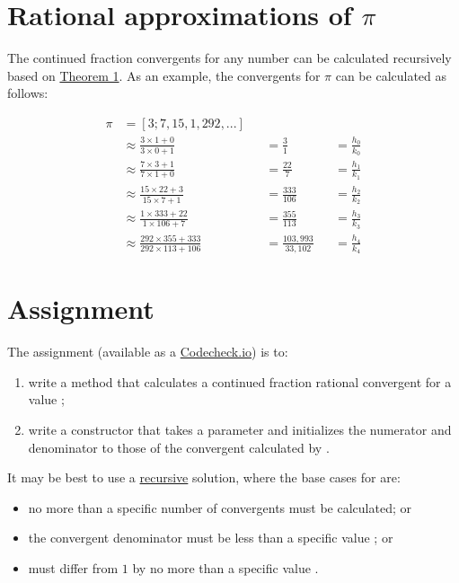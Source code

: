 \documentclass[11pt]{article}%
\begin{document}
\section{Rational approximations of \(\pi\)}
\label{Representation}

The continued fraction convergents for any number can be calculated recursively based on \href{http://en.wikipedia.org/wiki/Continued_fraction#Some_useful_theorems}{Theorem 1}. As an example, the convergents for \(\pi\) can be calculated as follows:

\begin{align}
\pi &= [3; 7, 15, 1, 292, ...] \\
 &\approx \frac{3 \times 1 + 0}{3 \times 0 + 1} &&= \frac{3}{1} &&= \frac{h_0}{k_0} \\
 &\approx \frac{7 \times 3 + 1}{7 \times 1 + 0} &&= \frac{22}{7} &&= \frac{h_1}{k_1} \\
 &\approx \frac{15 \times 22 + 3}{15 \times 7 + 1} &&= \frac{333}{106} &&= \frac{h_2}{k_2} \\
 &\approx \frac{1 \times 333 + 22}{1 \times 106 + 7} &&= \frac{355}{113} &&= \frac{h_3}{k_3} \\
 &\approx \frac{292 \times 355 + 333}{292 \times 113 + 106} &&= \frac{103,993}{33,102} &&= \frac{h_4}{k_4} 
\end{align}

\section{Assignment}
\label{Assignment}

The assignment (available as a \href{https://codecheck.io/files/2301021526c10hc6gpjmpim58br3mnbmk0v}{Codecheck.io}) is to:
\begin{enumerate}[label=\alph*)]
  \item write a method  that calculates a continued fraction rational convergent for a value ;
  \item write a constructor that takes a  parameter and initializes the numerator and denominator to those of the convergent calculated by .
\end{enumerate}

It may be best to use a \href{http://www.catb.org/jargon/html/R/recursion.html}{recursive} solution, where the base cases for  are:
\begin{itemize}
  \item no more than a specific number of convergents  must be calculated; or
  \item the convergent denominator must be less than a specific value ; or
  \item {} must differ from \(1\) by no more than a specific value .
\end{itemize}
\end{document}
